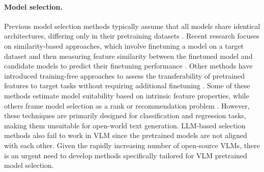 \paragraph{Model selection.} Previous model selection methods typically assume that all models share identical architectures, differing only in their pretraining datasets \cite{tran2019transferability}. Recent research focuses on similarity-based approaches, which involve finetuning a model on a target dataset and then measuring feature similarity between the finetuned model and candidate models to predict their finetuning performance \cite{vu2020exploring}. Other methods have introduced training-free approaches to assess the transferability of pretrained features to target tasks without requiring additional finetuning \cite{you2021logme}. Some of these methods estimate model suitability based on intrinsic feature properties, while others frame model selection as a rank or recommendation problem \cite{vu2020exploring}. However, these techniques are primarily designed for classification and regression tasks, making them unsuitable for open-world text generation\cite{bao2019plato}. LLM-based selection~\cite{lin2024selecting} methods also fail to work in VLM since the pretrained models are not aligned with each other. Given the rapidly increasing number of open-source VLMs, there is an urgent need to develop methods specifically tailored for VLM pretrained model selection.


